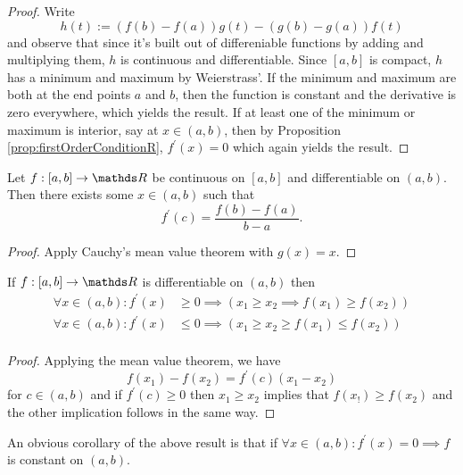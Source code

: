 \begin{proof}
Write 
\[
h\left(t\right):=\left(f\left(b\right)-f\left(a\right)\right)g\left(t\right)-\left(g\left(b\right)-g\left(a\right)\right)f\left(t\right)
\]
and observe that since it's built out of differeniable functions by
adding and multiplying them, $h$ is continuous and differentiable.
Since $\left[a,b\right]$ is compact, $h$ has a minimum and maximum
by Weierstrass'. If the minimum and maximum are both at the end points
$a$ and $b$, then the function is constant and the derivative is
zero everywhere, which yields the result. If at least one of the minimum
or maximum is interior, say at $x\in\left(a,b\right)$, then by Proposition
\ref{prop:firstOrderConditionR}, $f^{\prime}\left(x\right)=0$ which
again yields the result.
\end{proof}
\begin{cor}
\label{cor:meanValueThm}Let $f:\left[a,b\right]\to\R$ be continuous
on $\left[a,b\right]$ and differentiable on $\left(a,b\right).$
Then there exists some $x\in\left(a,b\right)$ such that
\[
f^{\prime}\left(c\right)=\frac{f\left(b\right)-f\left(a\right)}{b-a}.
\]
\end{cor}

\begin{proof}
Apply Cauchy's mean value theorem with $g\left(x\right)=x$.
\end{proof}
\begin{prop}
\label{prop:derivativeAndMonotonicity}If $f:\left[a,b\right]\to\R$
is differentiable on $\left(a,b\right)$ then
\begin{align*}
\forall x\in\left(a,b\right):f^{\prime}\left(x\right) & \geq0\implies\left(x_{1}\geq x_{2}\implies f\left(x_{1}\right)\geq f\left(x_{2}\right)\right)\\
\forall x\in\left(a,b\right):f^{\prime}\left(x\right) & \leq0\implies\left(x_{1}\geq x_{2}\geq f\left(x_{1}\right)\leq f\left(x_{2}\right)\right)\\
\end{align*}
\end{prop}

\begin{proof}
Applying the mean value theorem, we have 
\[
f\left(x_{1}\right)-f\left(x_{2}\right)=f^{\prime}\left(c\right)\left(x_{1}-x_{2}\right)
\]
for $c\in\left(a,b\right)$ and if $f^{\prime}\left(c\right)\geq0$
then $x_{1}\geq x_{2}$ implies that $f\left(x_{!}\right)\geq f\left(x_{2}\right)$
and the other implication follows in the same way.
\end{proof}
\begin{rem*}
An obvious corollary of the above result is that if $\forall x\in\left(a,b\right)$$:f^{\prime}\left(x\right)=0\implies f$
is constant on $\left(a,b\right)$.
\end{rem*}

